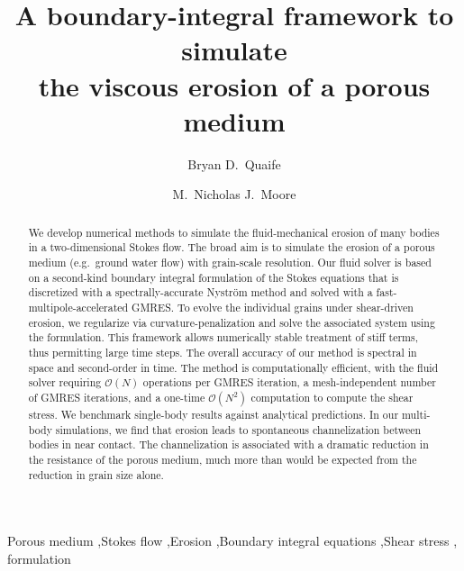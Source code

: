 \documentclass[preprint, 10pt]{elsarticle}
\begin{document}
\title{A boundary-integral framework to simulate \\ the viscous erosion of a porous medium}



\author[Bryan]{Bryan D.~Quaife}
\author[Nick]{M.~Nicholas J.~Moore}
\address[Nick]{Department of Mathematics and Geophysical Fluid Dynamics Institute, Florida State University, Tallahassee, FL, 32306.}
\address[Bryan]{Department of Scientific Computing and Geophysical Fluid Dynamics Institute, Florida State University, Tallahassee, FL, 32306.}

\begin{abstract} 
We develop numerical methods to simulate the fluid-mechanical erosion of many bodies in a two-dimensional Stokes flow. The broad aim is to simulate the erosion of a porous medium (e.g.~ground water flow) with grain-scale resolution. Our fluid solver is based on a second-kind boundary integral formulation of the Stokes equations that is discretized with a spectrally-accurate Nystr\"om method and solved with a fast-multipole-accelerated GMRES. To evolve the individual grains under shear-driven erosion, we regularize via curvature-penalization and solve the associated system using the {\thL} formulation. This framework allows numerically stable treatment of stiff terms, thus permitting large time
steps. The overall accuracy of our method is spectral in space and second-order in time. The method is computationally efficient, with the fluid solver requiring $\mathcal{O}(N)$ operations per GMRES iteration, a mesh-independent number of GMRES iterations, and a one-time $\mathcal{O}(N^2)$ computation to compute the shear stress. We benchmark single-body results against analytical predictions. In our multi-body simulations, we find that erosion leads to spontaneous channelization between bodies in near contact. The channelization is associated with a dramatic reduction in the resistance of the porous medium, much more than would be expected from the reduction in grain size alone.
\end{abstract}

\begin{keyword}
  Porous medium \sep Stokes flow \sep Erosion \sep Boundary integral
  equations \sep Shear stress \sep {\thL} formulation
\end{keyword}
\end{document}
